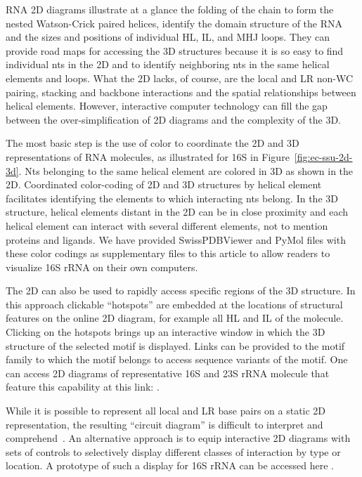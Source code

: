 RNA 2D diagrams illustrate at a glance the folding of the chain to form the
nested Watson-Crick paired helices, identify the domain structure of the RNA and
the sizes and positions of individual HL, IL, and MHJ loops. They can provide
road maps for accessing the 3D structures because it is so easy to find
individual nts in the 2D and to identify neighboring nts in the same helical
elements and loops. What the 2D lacks, of course, are the local and LR non-WC
pairing, stacking and backbone interactions and the spatial relationships
between helical elements. However, interactive computer technology can fill the
gap between the over-simplification of 2D diagrams and the complexity of the 3D\@. 

The most basic step is the use of color to coordinate the 2D and 3D
representations of RNA molecules, as illustrated for 16S in
Figure~\ref{fig:ec-ssu-2d-3d}. Nts belonging to the same helical element are
colored in 3D as shown in the 2D\@. Coordinated color-coding of 2D and 3D
structures by helical element facilitates identifying the elements to which
interacting nts belong. In the 3D structure, helical elements distant in the 2D
can be in close proximity and each helical element can interact with several
different elements, not to mention proteins and ligands.  We have provided
SwissPDBViewer and PyMol files with these color codings as supplementary files
to this article to allow readers to visualize \EC{} 16S rRNA on their own
computers. 

The 2D can also be used to rapidly access specific regions of the 3D structure.
In this approach clickable ``hotspots'' are embedded at the locations of
structural features on the online 2D diagram, for example all HL and IL of the
molecule. Clicking on the hotspots brings up an interactive window in which the
3D structure of the selected motif is displayed. Links can be provided to the
motif family to which the motif belongs to access sequence variants of the
motif. One can access 2D diagrams of representative 16S and 23S rRNA molecule
that feature this capability at this link:
.

While it is possible to represent all local and LR base pairs on a static 2D
representation, the resulting ``circuit diagram'' is difficult to interpret and
comprehend~\cite{Lescoute2006a}. An alternative approach is to equip interactive
2D diagrams with sets of controls to selectively display different classes of
interaction by type or location. A prototype of such a display for 16S rRNA can
be accessed here .

